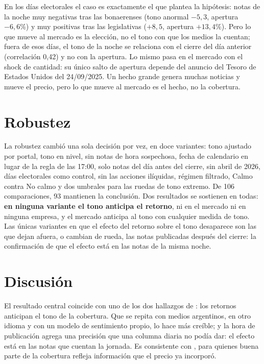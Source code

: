 En los días electorales el caso es exactamente el que plantea la hipótesis: notas de la noche
muy negativas tras las bonaerenses (tono anormal $-5{,}3$, apertura $-6{,}6\%$) y muy positivas
tras las legislativas ($+8{,}5$, apertura $+13{,}4\%$). Pero lo que mueve al mercado es la
elección, no el tono con que los medios la cuentan; fuera de esos días, el tono de la noche se
relaciona con el cierre del día anterior (correlación 0,42) y no con la apertura. Lo mismo pasa en
el mercado con el shock de cantidad: su único salto de apertura depende del anuncio del Tesoro de
Estados Unidos del 24/09/2025. Un hecho grande genera muchas noticias y mueve el precio, pero lo
que mueve al mercado es el hecho, no la cobertura.

\section{Robustez}
\label{sec:var-robustez}

La robustez cambió una sola decisión por vez, en doce variantes: tono ajustado por portal, tono en
nivel, sin notas de hora sospechosa, fecha de calendario en lugar de la regla de las 17:00, solo
notas del día antes del cierre, sin abril de 2026, días electorales como control, sin las acciones
ilíquidas, régimen filtrado, Calmo contra No calmo y dos umbrales para las ruedas de tono extremo.
De 106 comparaciones, 93 mantienen la conclusión. Dos resultados se sostienen
en todas: \textbf{en ninguna variante el tono anticipa el retorno}, ni en el mercado ni en ninguna
empresa, y el mercado anticipa al tono con cualquier medida de tono. Las únicas variantes en que
el efecto del retorno sobre el tono desaparece son las que dejan afuera, o cambian de rueda, las
notas publicadas después del cierre: la confirmación de que el efecto está en las notas de la
misma noche.


\section{Discusión}

El resultado central coincide con uno de los dos hallazgos de \citet{tetlock2007}: los retornos
anticipan el tono de la cobertura. Que se repita con medios argentinos, en otro idioma y con un
modelo de sentimiento propio, lo hace más creíble; y la hora de publicación agrega una precisión
que una columna diaria no podía dar: el efecto está en las notas que cuentan la jornada. Es
consistente con \citet{verma2026}, para quienes buena parte de la cobertura refleja información
que el precio ya incorporó.

